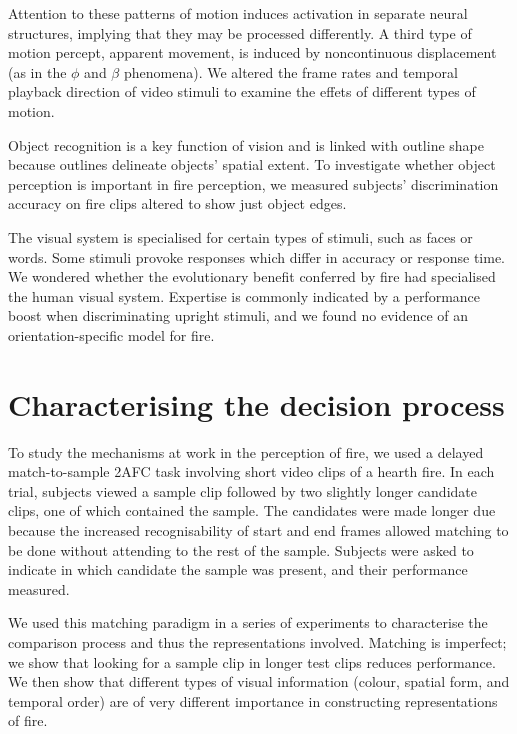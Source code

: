 \documentclass[a4paper]{article}
\begin{document}
Attention to these patterns of motion induces activation in separate neural structures\cite{ashida2007fmri,vaina1998selective}, implying that they may be processed differently.  A third type of motion percept, apparent movement, is induced by noncontinuous displacement (as in the $\phi$ and $\beta$ phenomena)\cite{steinman2000phi}. We altered the frame rates and temporal playback direction of video stimuli to examine the effets of different types of motion.

Object recognition is a key function of vision\cite{pelli2013object,dicarlo2012does} and is linked with outline shape\cite{hayward1998effects} because outlines delineate objects' spatial extent. To investigate whether object perception is important in fire perception, we measured subjects' discrimination accuracy on fire clips altered to show just object edges.

The visual system is specialised for certain types of stimuli, such as faces\cite{gauthier2001development,de2002specialization} or words\cite{cohen2004specialization}. Some stimuli provoke responses which differ in accuracy or response time\cite{fox2000facial}. We wondered whether the evolutionary benefit conferred by fire had specialised the human visual system. Expertise is commonly indicated by a performance boost when discriminating upright stimuli\cite{valentine1998upside}, and we found no evidence of an orientation-specific model for fire.



\section{Characterising the decision process}

To study the mechanisms at work in the perception of fire, we used a delayed match-to-sample 2AFC task involving short video clips of a hearth fire. In each trial, subjects viewed a sample clip followed by two slightly longer candidate clips, one of which contained the sample. The candidates were made longer due because the increased recognisability of start and end frames allowed matching to be done without attending to the rest of the sample. Subjects were asked to indicate in which candidate the sample was present, and their performance measured.

We used this matching paradigm in a series of experiments to characterise the comparison process and thus the representations involved. Matching is imperfect; we show that looking for a sample clip in longer test clips reduces performance. We then show that different types of visual information (colour, spatial form, and temporal order) are of very different importance in constructing representations of fire.
\end{document}
